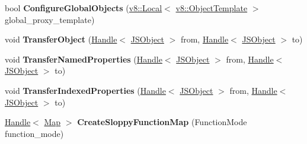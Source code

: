 \begin{DoxyCompactItemize}
\item 
bool {\bfseries Configure\+Global\+Objects} (\hyperlink{classv8_1_1_local}{v8\+::\+Local}$<$ \hyperlink{classv8_1_1_object_template}{v8\+::\+Object\+Template} $>$ global\+\_\+proxy\+\_\+template)\hypertarget{classv8_1_1internal_1_1_b_a_s_e___e_m_b_e_d_d_e_d_af2d8be259ebb3592c9915fe72d4d74f7}{}\label{classv8_1_1internal_1_1_b_a_s_e___e_m_b_e_d_d_e_d_af2d8be259ebb3592c9915fe72d4d74f7}

\item 
void {\bfseries Transfer\+Object} (\hyperlink{classv8_1_1internal_1_1_handle}{Handle}$<$ \hyperlink{classv8_1_1internal_1_1_j_s_object}{J\+S\+Object} $>$ from, \hyperlink{classv8_1_1internal_1_1_handle}{Handle}$<$ \hyperlink{classv8_1_1internal_1_1_j_s_object}{J\+S\+Object} $>$ to)\hypertarget{classv8_1_1internal_1_1_b_a_s_e___e_m_b_e_d_d_e_d_ac208819867c24f646e9f710d05d58401}{}\label{classv8_1_1internal_1_1_b_a_s_e___e_m_b_e_d_d_e_d_ac208819867c24f646e9f710d05d58401}

\item 
void {\bfseries Transfer\+Named\+Properties} (\hyperlink{classv8_1_1internal_1_1_handle}{Handle}$<$ \hyperlink{classv8_1_1internal_1_1_j_s_object}{J\+S\+Object} $>$ from, \hyperlink{classv8_1_1internal_1_1_handle}{Handle}$<$ \hyperlink{classv8_1_1internal_1_1_j_s_object}{J\+S\+Object} $>$ to)\hypertarget{classv8_1_1internal_1_1_b_a_s_e___e_m_b_e_d_d_e_d_a8debc0f515575cafea47b9510ae3a571}{}\label{classv8_1_1internal_1_1_b_a_s_e___e_m_b_e_d_d_e_d_a8debc0f515575cafea47b9510ae3a571}

\item 
void {\bfseries Transfer\+Indexed\+Properties} (\hyperlink{classv8_1_1internal_1_1_handle}{Handle}$<$ \hyperlink{classv8_1_1internal_1_1_j_s_object}{J\+S\+Object} $>$ from, \hyperlink{classv8_1_1internal_1_1_handle}{Handle}$<$ \hyperlink{classv8_1_1internal_1_1_j_s_object}{J\+S\+Object} $>$ to)\hypertarget{classv8_1_1internal_1_1_b_a_s_e___e_m_b_e_d_d_e_d_ab2500bbdb4d5ca44d97048122a70171f}{}\label{classv8_1_1internal_1_1_b_a_s_e___e_m_b_e_d_d_e_d_ab2500bbdb4d5ca44d97048122a70171f}

\item 
\hyperlink{classv8_1_1internal_1_1_handle}{Handle}$<$ \hyperlink{classv8_1_1internal_1_1_map}{Map} $>$ {\bfseries Create\+Sloppy\+Function\+Map} (Function\+Mode function\+\_\+mode)\hypertarget{classv8_1_1internal_1_1_b_a_s_e___e_m_b_e_d_d_e_d_ae21cda5f6a1de3c0a67d3d4a08604f12}{}\label{classv8_1_1internal_1_1_b_a_s_e___e_m_b_e_d_d_e_d_ae21cda5f6a1de3c0a67d3d4a08604f12}


\end{DoxyCompactItemize}
